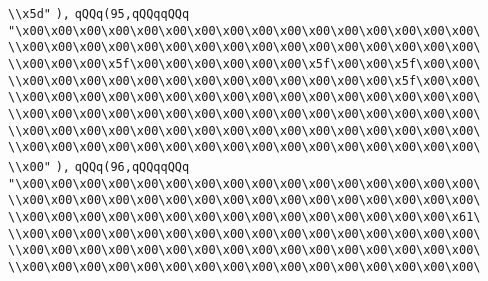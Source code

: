 \verb|\\x5d"|\newline
\verb|),|\newline
\verb|qQQq(95,qQQqqQQq|\newline
\verb|"\x00\x00\x00\x00\x00\x00\x00\x00\x00\x00\x00\x00\x00\x00\x00\x00\|\newline
\verb|\\x00\x00\x00\x00\x00\x00\x00\x00\x00\x00\x00\x00\x00\x00\x00\x00\|\newline
\verb|\\x00\x00\x00\x5f\x00\x00\x00\x00\x00\x00\x5f\x00\x00\x5f\x00\x00\|\newline
\verb|\\x00\x00\x00\x00\x00\x00\x00\x00\x00\x00\x00\x00\x00\x5f\x00\x00\|\newline
\verb|\\x00\x00\x00\x00\x00\x00\x00\x00\x00\x00\x00\x00\x00\x00\x00\x00\|\newline
\verb|\\x00\x00\x00\x00\x00\x00\x00\x00\x00\x00\x00\x00\x00\x00\x00\x00\|\newline
\verb|\\x00\x00\x00\x00\x00\x00\x00\x00\x00\x00\x00\x00\x00\x00\x00\x00\|\newline
\verb|\\x00\x00\x00\x00\x00\x00\x00\x00\x00\x00\x00\x00\x00\x00\x00\x00\|\newline
\verb|\\x00"|\newline
\verb|),|\newline
\verb|qQQq(96,qQQqqQQq|\newline
\verb|"\x00\x00\x00\x00\x00\x00\x00\x00\x00\x00\x00\x00\x00\x00\x00\x00\|\newline
\verb|\\x00\x00\x00\x00\x00\x00\x00\x00\x00\x00\x00\x00\x00\x00\x00\x00\|\newline
\verb|\\x00\x00\x00\x00\x00\x00\x00\x00\x00\x00\x00\x00\x00\x00\x00\x61\|\newline
\verb|\\x00\x00\x00\x00\x00\x00\x00\x00\x00\x00\x00\x00\x00\x00\x00\x00\|\newline
\verb|\\x00\x00\x00\x00\x00\x00\x00\x00\x00\x00\x00\x00\x00\x00\x00\x00\|\newline
\verb|\\x00\x00\x00\x00\x00\x00\x00\x00\x00\x00\x00\x00\x00\x00\x00\x00\|\newline
